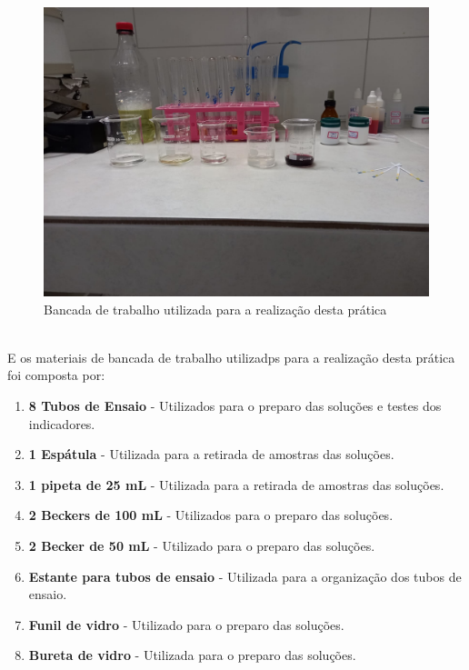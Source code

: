     \begin{figure}[h]
        \centering
        \includegraphics[scale=0.25]{pictures/bancada.jpeg}
        \caption{Bancada de trabalho utilizada para a realização desta prática}\label{fig:figure1}
    \end{figure}\\

    \indent E os materiais de bancada de trabalho utilizadps para a realização desta prática foi composta por:
    \begin{enumerate}
        \item \textbf{8 Tubos de Ensaio} - Utilizados para o preparo das soluções e testes dos indicadores.
        \item \textbf{1 Espátula} - Utilizada para a retirada de amostras das soluções.
        \item \textbf{1 pipeta de 25 mL} - Utilizada para a retirada de amostras das soluções.
        \item \textbf{2 Beckers de 100 mL} - Utilizados para o preparo das soluções.
        \item \textbf{2 Becker de 50 mL} - Utilizado para o preparo das soluções.
        \item \textbf{Estante para tubos de ensaio} - Utilizada para a organização dos tubos de ensaio.
        \item \textbf{Funil de vidro} - Utilizado para o preparo das soluções.
        \item \textbf{Bureta de vidro} - Utilizada para o preparo das soluções.
    \end{enumerate}

